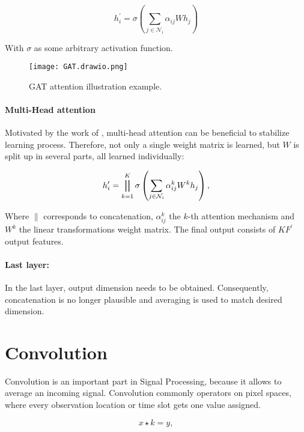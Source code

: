 \begin{equation}
  h_i^{\prime} = \sigma \left( \sum_{j \in \mathcal{N}_i} \alpha_{ij} W h_j \right)
\end{equation}

With $\sigma$ as some arbitrary activation function.

\begin{figure}[H]
  \centering
  \texttt{[image: GAT.drawio.png]}
  \caption{GAT attention illustration example.}
  \label{fig:gat_attention_illustration}
\end{figure}


\paragraph{Multi-Head attention}
Motivated by the work of \citet{transformer}, multi-head attention can be beneficial to stabilize learning process.
Therefore, not only a single weight matrix is learned, but $W$ is split up in several parts, 
all learned individually:

\begin{equation}
  h_i^{\prime} = \bigparallel^K_{k=1} \sigma \left(\sum_{j \in \mathcal{N}_i} \alpha_{ij}^k W^k h_j \right),  
\end{equation}

Where $\parallel$ corresponds to concatenation, $\alpha_{ij}^k$ the $k$-th attention mechanism and $W^k$ the linear
transformations weight matrix. The final output consists of $KF^{\prime}$ output features.

\paragraph{Last layer:}
In the last layer, output dimension needs to be obtained. 
Consequently, concatenation is no longer plausible and averaging is used to match desired dimension.

\section{Convolution}
Convolution is an important part in Signal Processing, because it allows to average an incoming signal.
Convolution commonly operators on pixel spaces, where every observation location or time slot gets one value assigned.

\begin{equation}
  x \star k = y,
\end{equation}

